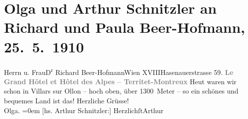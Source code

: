 

         
         \renewcommand{\erwaehntePersonen}{Personen: Richard Beer-Hofmann, Paula Beer-Hofmann, Olga Schnitzler}
         \renewcommand{\erwaehnteOrte}{Orte: Hasenauerstraße, Hôtel des Alpes-Grand Hôtel, Territet, Villars-sur-Ollon, Wien, XVIII., Währing}
         \renewcommand{\erwaehnteWerke}{}
               \section[Olga und Arthur Schnitzler an Richard und Paula Beer-Hofmann, 25. 5. 1910]{ Olga und Arthur Schnitzler an Richard und Paula Beer-Hofmann,
               25. 5. 1910}\nopagebreak{}\rehead{ }\begin{ledgroupsized}[t]{13cm}\normalsize\beginnumbering \toendnotes[C]{\smallbreak\pagebreak[2]} 
\toendnotes[C]{\smallbreak}\pstart{}{\pb}Herrn u. Frau\pend{}\pstart{}D\textsuperscript{r} Richard Beer-Hofmann\pend{}\pstart{}Wien XVIII\pend{}\pstart{}Hasenauerstrasse 59.\pend{}{\bigskip}\pstart
           \noindent{}\centering{}{\pb}\textcolor{gray}{\textbf{Le Grand Hôtel et Hôtel des Alpes – Territet-Montreux}}\pend
           \pstart
           {\pb}Heut waren wir schon in Villars sur Ollon – hoch oben, über 1300 Meter – so ein
               schönes und bequemes Land ist das!\pend
           \pstart
           Herzliche Grüsse!{\\[\baselineskip]}\spacefill\mbox{Olga.}\pend
           \leftskip=0em{}\pstart
           {[}hs. Arthur Schnitzler:{]} Herzlichſt\spacefill\mbox{Arthur}\pend
           
         
         \endnumbering{}\end{ledgroupsized}  \newcommand{\dateiname}{L02558}\newcommand{\titel}{Olga und Arthur Schnitzler an Richard und Paula Beer-Hofmann, 25. 5. 1910}\newcommand{\editorInnen}{Martin Anton Müller und Gerd-Hermann Susen}
      